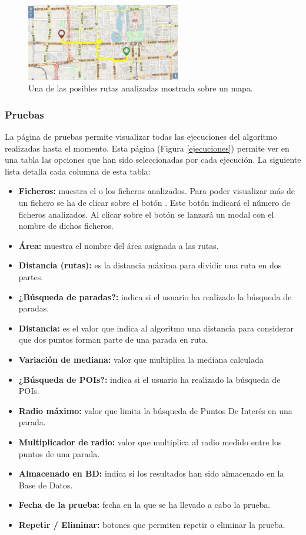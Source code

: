 \begin{figure}[h]
  \centering
    \includegraphics[width=0.6\textwidth]{../img/manualusuario/rutaanalizada.jpg}
  \caption{Una de las posibles rutas analizadas mostrada sobre un mapa.}
  \label{rutaanalizada}
\end{figure}


\subsubsection{Pruebas}
La página de pruebas permite visualizar todas las ejecuciones del algoritmo realizadas hasta el momento. Esta página (Figura \ref{ejecuciones}) permite ver en una tabla las opciones que han sido seleccionadas por cada ejecución. La siguiente lista detalla cada columna de esta tabla:

\begin{itemize}
	\item \textbf{Ficheros:} muestra el o los ficheros analizados. Para poder visualizar más de un fichero se ha de clicar sobre el botón . Este botón indicará el número de ficheros analizados. Al clicar sobre el botón se lanzará un modal con el nombre de dichos ficheros.
	\item \textbf{Área:} muestra el nombre del área asignada a las rutas.
	\item \textbf{Distancia (rutas):} es la distancia máxima para dividir una ruta en dos partes.
	\item \textbf{¿Búsqueda de paradas?:} indica si el usuario ha realizado la búsqueda de paradas.
	\item \textbf{Distancia:} es el valor que indica al algoritmo una distancia para considerar que dos puntos forman parte de una parada en ruta.
	\item \textbf{Variación de mediana:} valor que multiplica la mediana calculada
	\item \textbf{¿Búsqueda de POIs?:} indica si el usuario ha realizado la búsqueda de POIs.
	\item \textbf{Radio máximo:} valor que limita la búsqueda de Puntos De Interés en una parada.
	\item \textbf{Multiplicador de radio:} valor que multiplica al radio medido entre los puntos de una parada.
	\item \textbf{Almacenado en BD:} indica si los resultados han sido almacenado en la Base de Datos.
	\item \textbf{Fecha de la prueba:} fecha en la que se ha llevado a cabo la prueba.
	\item \textbf{Repetir / Eliminar:} botones que permiten repetir o eliminar la prueba.
\end{itemize}

